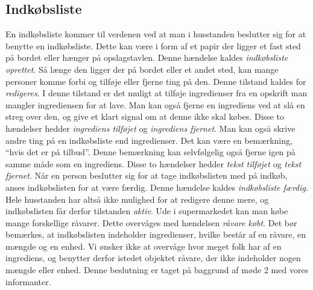 \subsection{Indkøbsliste}
En indkøbsliste kommer til verdenen ved at man i husstanden beslutter sig for at benytte en indkøbsliste. Dette kan være i form af et papir der ligger et fast sted på bordet eller hænger på opslagstavlen. Denne hændelse kaldes \textit{indkøbsliste oprettet}. Så længe den ligger der på bordet eller et andet sted, kan mange personer komme forbi og tilføje eller fjerne ting på den. Denne tilstand kaldes for \textit{redigeres}. I denne tilstand er det muligt at tilføje ingredienser fra en opskrift man mangler ingrediensen for at lave. Man kan også fjerne en ingrediens ved at slå en streg over den, og give et klart signal om at denne ikke skal købes. Disse to hændelser hedder \textit{ingrediens tilføjet} og \textit{ingrediens fjernet}. Man kan også skrive andre ting på en indkøbsliste end ingredienser. Det kan være en bemærkning, \fx ``hvis det er på tilbud''. Denne bemærkning kan selvfølgelig også fjerne igen på samme måde som en ingrediens. Disse to hændelser hedder \textit{tekst tilføjet} og \textit{tekst fjernet}. Når en person beslutter sig for at tage indkøbslisten med på indkøb, anses indkøbslisten for at være færdig. Denne hændelse kaldes \textit{indkøbsliste færdig}. Hele husstanden har altså ikke mulighed for at redigere denne mere, og indkøbslisten får derfor tilstanden \textit{aktiv}. Ude i supermarkedet kan man købe mange forskellige råvarer. Dette overvåges med hændelsen \textit{råvare købt}. Det bør bemærkes, at indkøbslisten indeholder ingredienser, hvilke består af en råvare, en mængde og en enhed. Vi ønsker ikke at overvåge hvor meget folk har af en ingrediens, og benytter derfor istedet objektet råvare, der ikke indeholder nogen mængde eller enhed. Denne beslutning er taget på baggrund af møde 2 med vores informanter. 
\begin{figure}[htp]
\centering
\scalebox{0.6}{
}
\label{fig:indkoebsliste-adfaerd}
\end{figure}